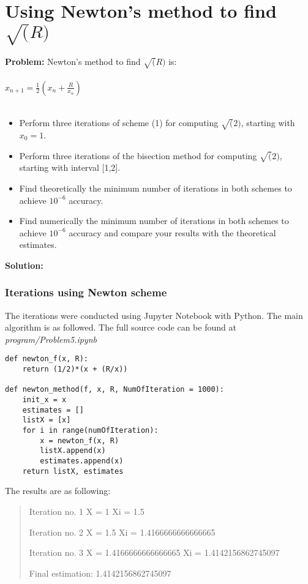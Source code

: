 \newpage

\section{Using Newton's method to find $\sqrt(R)$ }%
\label{sec:newton_s_method_to_find_sqrt_r_}

\textbf{Problem:}
Newton's method to find $\sqrt(R)$ is:\\
\\
$x_{n+1} = \frac{1}{2} (x_n + \frac{R}{x_n})$ \\
\\
\begin{itemize}
    \item Perform three iterations of scheme (1) for computing $\sqrt(2)$, starting with $x_0 = 1$.
    \item Perform three iterations of the bisection method for computing $\sqrt(2)$, starting with interval [1,2].
    \item Find theoretically the minimum number of iterations in both schemes to achieve $10^{-6}$ accuracy.
    \item Find numerically the minimum number of iterations in both schemes to achieve $10^{-6}$ accuracy and compare your results with the theoretical estimates.
\end{itemize}

\textbf{Solution:}
\subsubsection{Iterations using Newton scheme}
The iterations were conducted using Jupyter Notebook with Python. The main algorithm is as followed. The full source code can be found at \textit{program/Problem5.ipynb}
\begin{lstlisting}
def newton_f(x, R):
    return (1/2)*(x + (R/x))

def newton_method(f, x, R, NumOfIteration = 1000):
    init_x = x
    estimates = []
    listX = [x]
    for i in range(numOfIteration):
        x = newton_f(x, R)
        listX.append(x)
        estimates.append(x)
    return listX, estimates
\end{lstlisting}

The results are as following:
\begin{quote}
Iteration no. 1
X =  1
Xi =  1.5

Iteration no. 2
X =  1.5
Xi =  1.4166666666666665

Iteration no. 3
X =  1.4166666666666665
Xi =  1.4142156862745097

Final estimation:  1.4142156862745097
\end{quote}

